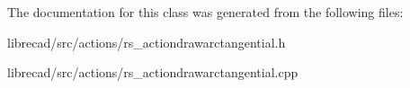 The documentation for this class was generated from the following files\-:\begin{DoxyCompactItemize}
\item 
librecad/src/actions/rs\-\_\-actiondrawarctangential.\-h\item 
librecad/src/actions/rs\-\_\-actiondrawarctangential.\-cpp\end{DoxyCompactItemize}
